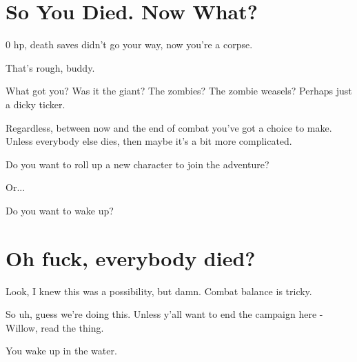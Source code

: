 \onecolumn
\section {So You Died. Now What?}

0 hp, death saves didn't go your way, now you're a corpse. 

\vspace{0.5cm}

That's rough, buddy.

\vspace{0.5cm}

What got you? Was it the giant? The zombies? The zombie weasels? Perhaps just a dicky ticker.

Regardless, between now and the end of combat you've got a choice to make. Unless everybody else dies, then maybe it's a bit more complicated.

\vspace{0.5cm}

Do you want to roll up a new character to join the adventure?

\vspace{0.5cm}

Or...

\vspace{0.5cm}

Do you want to wake up?

\vspace{5cm}

\section {Oh fuck, everybody died?}

Look, I knew this was a possibility, but damn. Combat balance is tricky.

So uh, guess we're doing this. Unless y'all want to end the campaign here - Willow, read the thing.

\vspace{5cm}

\begin{DndReadAloud}
  You wake up in the water.
\end{DndReadAloud}

\twocolumn
